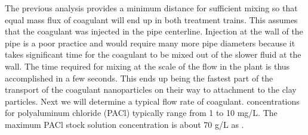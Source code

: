 \documentclass[letterpaper,10pt,english]{sphinxmanual}
\begin{document}
%
\begin{sphinxVerbatim}[commandchars=\\\{\}]
  
  
    
  
  
  
  
  
  
\end{sphinxVerbatim}

The previous analysis provides a minimum distance for sufficient mixing so that equal mass flux of coagulant will end up in both treatment trains. This assumes that the coagulant was injected in the pipe centerline. Injection at the wall of the pipe is a poor practice and would require many more pipe diameters because it takes significant time for the coagulant to be mixed out of the slower fluid at the wall. The time required for mixing at the scale of the flow in the plant is thus accomplished in a few seconds. This ends up being the fastest part of the transport of the coagulant nanoparticles on their way to attachment to the clay particles.  Next we will determine a typical flow rate of coagulant.  concentrations for polyaluminum chloride (PACl) typically range from 1 to 10 mg/L. The maximum PACl stock solution concentration is about 70 g/L as .
\end{document}
